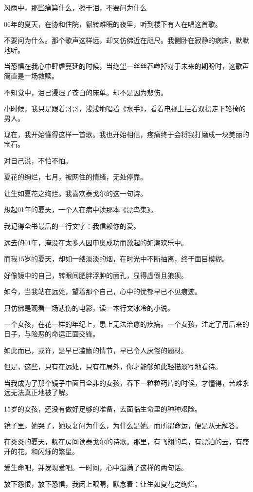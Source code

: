 \documentclass[12pt,a4paper]{article}
\def\blankrev{\vspace{1ex}}									%
\begin{document}
		\longpoem{}{}{}
			风雨中，那些痛算什么，擦干泪，不要问为什么
		\endlongpoem

		06年的夏天，在协和住院，辗转难眠的夜里，听到楼下有人在唱这首歌。

		不要问为什么。那个歌声这样远，却又仿佛近在咫尺。我侧卧在寂静的病床，默默地听。

		当恐惧在我心中肆虐蔓延的时候，当绝望一丝丝吞噬掉对于未来的期盼时，这歌声简直是一场救赎。

		不知觉中，泪已浸湿了苍白的床单。却不是因为悲伤。

		小时候，我只是跟着哥哥，浅浅地唱着《水手》，看着电视上拄着双拐走下轮椅的男人。

		现在，我开始懂得这样一首歌。我也开始相信，疼痛终于会将我打磨成一块美丽的宝石。

		对自己说，不怕不怕。

	\endwriting



		夏花的绚烂，七月，被网住的情绪，无处停靠。

		\blankrev
		让生如夏花之绚烂。我喜欢泰戈尔的这一句诗。\par
		想起01年的夏天，一个人在病中读那本《漂鸟集》。\par
		我记得全书最后的一行文字：我信赖你的爱。

		远去的01年，淹没在太多人因申奥成功而激起的如潮欢乐中。\par
		而我15岁的夏天，却如一缕淡淡的烟，在时光中不断抽离，终于面目模糊。\par
		好像镜中的自己，转眼间肥胖浮肿的面孔，显得虚假且狼狈。

		如今，当我站在远处，望着那个自己，心中的忧郁早已不见痕迹。\par
		只仿佛是观看一场悲伤的电影，读一本行文冰冷的小说。\par
		一个女孩，在花一样的年纪上，患上无法治愈的疾病。一个女孩，注定了用后来的日子，与险恶的命运正面交锋。\par
		如此而已，或许，是早已滥觞的情节，早已令人厌倦的题材。\par
		但是，这些，只有在远处，只有在局外，你才能够如此轻描淡写地看待。\par
		当我成为了那个镜子中面目全非的女孩，吞下一粒粒药片的时候，才懂得，苦难永远无法真正地被了解。

		15岁的女孩，还没有做好足够的准备，去面临生命里的种种艰险。\par
		镜子里，她哭了，她反复问为什么，为什么是她。而所谓命运，便是从无解答。\par
		在炎炎的夏天，躲在房间读泰戈尔的诗歌。那里，有飞翔的鸟，有漂泊的云，有盛开的花，和闪烁的繁星。\par
		爱生命吧，并发现爱吧。一时间，心中溢满了这样的两句话。\par
		放下怨恨，放下恐惧，我闭上眼睛，默念着：让生如夏花之绚烂。
\end{document}
